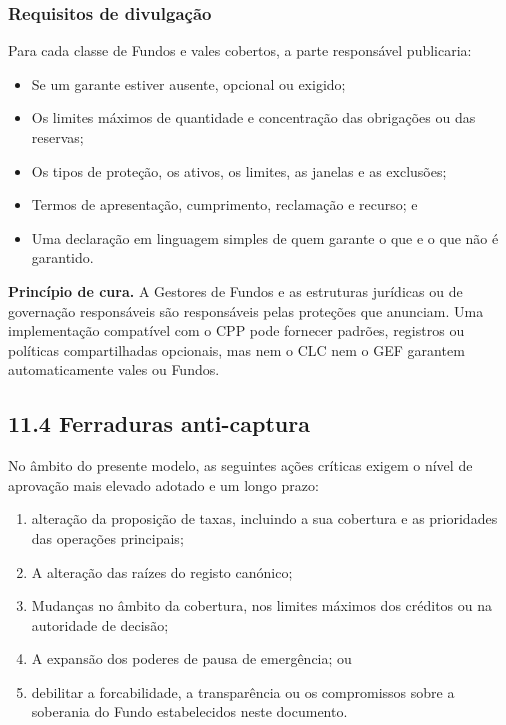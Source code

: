 \documentclass[11pt]{article}
\begin{document}
\subsubsection*{Requisitos de divulgação}

Para cada classe de Fundos e vales cobertos, a parte responsável publicaria:

\begin{itemize}[leftmargin=*]
\item Se um garante estiver ausente, opcional ou exigido;
\item Os limites máximos de quantidade e concentração das obrigações ou das reservas;
\item Os tipos de proteção, os ativos, os limites, as janelas e as exclusões;
\item Termos de apresentação, cumprimento, reclamação e recurso; e
\item Uma declaração em linguagem simples de quem garante o que e o que não é garantido.
\end{itemize}
\textbf{Princípio de cura.} A Gestores de Fundos e as estruturas jurídicas ou de governação responsáveis são responsáveis pelas proteções que anunciam. Uma implementação compatível com o CPP pode fornecer padrões, registros ou políticas compartilhadas opcionais, mas nem o CLC nem o GEF garantem automaticamente vales ou Fundos.

\subsection*{11.4 Ferraduras anti-captura}

No âmbito do presente modelo, as seguintes ações críticas exigem o nível de aprovação mais elevado adotado e um longo prazo:

\begin{enumerate}[leftmargin=*]
\item alteração da proposição de taxas, incluindo a sua cobertura e as prioridades das operações principais;
\item A alteração das raízes do registo canónico;
\item Mudanças no âmbito da cobertura, nos limites máximos dos créditos ou na autoridade de decisão;
\item A expansão dos poderes de pausa de emergência; ou
\item debilitar a forcabilidade, a transparência ou os compromissos sobre a soberania do Fundo estabelecidos neste documento.
\end{enumerate}
\end{document}

